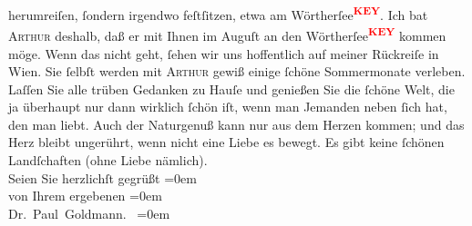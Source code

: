 \begin{ledgroupsized}[t]{13cm}
               herumreiſen, ſondern irgendwo feſtſitzen, etwa am Wörtherſee\textcolor{red}{\textsuperscript{\textbf{KEY}}}. Ich bat \textsc{Arthur} deshalb, daß er mit Ihnen im
                  Auguſt an den Wörtherſee\textcolor{red}{\textsuperscript{\textbf{KEY}}} kommen möge.
               Wenn das nicht geht, ſehen wir uns hoffentlich auf meiner Rückreiſe in Wien.\pend
           \pstart
           Sie ſelbſt werden mit \textsc{Arthur} gewiß einige ſchöne {\pb}
               Sommermonate verleben. Laſſen Sie alle trüben Gedanken zu Hauſe und genießen Sie die
               ſchöne Welt, die ja überhaupt nur dann wirklich ſchön iſt, wenn man Jemanden neben
               ſich hat, den man \strikeout{\textcolor{gray}{l}} liebt. Auch der Naturgenuß kann nur aus dem Herzen kommen; und das Herz bleibt
               ungerührt, wenn nicht eine Liebe es bewegt. Es gibt keine ſchönen Landſchaften (ohne
               Liebe nämlich). {\\[\baselineskip]}Seien Sie herzlichſt gegrüßt\pend
           \leftskip=0em{}\pstart
           {\\[\baselineskip]}von Ihrem ergebenen\pend
           \leftskip=0em{}\pstart
           {\\[\baselineskip]}\spacefill\mbox{Dr. Paul Goldmann. }\pend
           \leftskip=0em{}
         
         \endnumbering{}\end{ledgroupsized}\begin{anhang}\end{anhang}\newcommand{\dateiname}{L03527}\newcommand{\titel}{Paul Goldmann an Olga Gussmann, 10. 5. [1901]}\newcommand{\editorInnen}{Martin Anton Müller und Laura Untner}
      